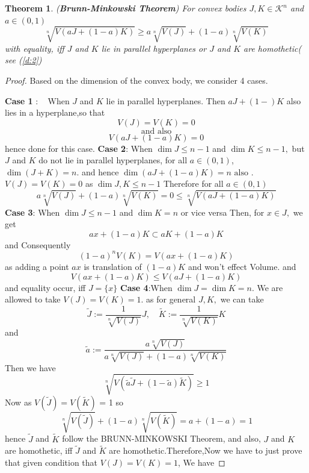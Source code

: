 \documentclass[oneside]{book}
\newtheorem{theorem}{Theorem}[section]
\begin{document}
	\begin{theorem}(\textbf{Brunn-Minkowski Theorem})
		\label{t:11}
		For convex bodies $J, K \in \mathcal{K}^{n}$ and $a \in(0,1)$
		\begin{equation}
			\label{eq54}
			\sqrt[n]{V(a J+(1-a) K)} \geq a \sqrt[n]{V(J)}+(1-a) \sqrt[n]{V(K)}
		\end{equation} \label{eq:4.19}
		with equality, iff $J$ and $K$ lie in parallel hyperplanes or $J$ and $K$ are homothetic( see (\ref{d:2})
	\end{theorem}
	\begin{proof}
		Based on the dimension of the convex body, we consider 4 cases.
		\hfill \break
		
		\textbf{Case 1} $: \quad \text{When } J$ and $K$ lie in parallel hyperplanes. Then  $a J+(1-) K$  also lies in a hyperplane,\quad so that $$V(J)=V(K)=0$$    $$\text{and also}$$ $$V(a J+(1-a) K)=0$$
		hence done for this case.
		\hfill \break
		\textbf{Case 2}: \quad  When $\operatorname{dim} J \leq n-1$ and $\operatorname{dim} K \leq n-1,$ but $J$ and $K$ do not lie in parallel hyperplanes, for all $a \in(0,1)$, $\operatorname{dim}(J+K)=n .$ and hence  $\operatorname{dim}(a J+(1-a) K)=n \text{ also }.$ 
		\hfill \break
		$V(J) = V(K)= 0$ as $\operatorname{dim} J,K \leq n-1 $ Therefore for all $a \in(0,1)$
		$$
		a \sqrt[n]{V(J)}+(1-a) \sqrt[n]{V(K)}=0 \leq \sqrt[n]{V(a J+(1-a) K)}
		$$
		\hfill \break
		\textbf{Case 3}: \quad  When $\operatorname{dim } J \leq n-1$ and $\operatorname{dim} K=n$ or vice versa
		\hfill \break 
		Then, for $x \in J,$ we get
		\[
		a x+(1-a) K \subset a K+(1-a) K
		\]
		and Consequently
		\[
		(1-a)^{n} V(K)=V(a x+(1-a) K) 
		\]
		as adding a point $a x $ is translation of $(1-a) K$ and won't effect Volume. 
		and
		$$ V(a x+(1-a) K) \leq V(a 
		J+(1-a) K)$$
		and equality occur, iff $J=\{x\}$ 
		\hfill \break
		\textbf{Case 4}:When $\operatorname{dim} J=\operatorname{dim} K=n .$  We are allowed to take $V(J)=V(K)=1 .$ as for general $J, K,$  we  can take
		\[
		\widetilde{J}:=\frac{1}{\sqrt[n]{V(J)}} J, \quad \widetilde{K}:=\frac{1}{\sqrt[n]{V(K)}} K
		\]
		and
		\[
		\widetilde{a}:=\frac{a \sqrt[n]{V(J)}}{a \sqrt[n]{V(J)}+(1-a) \sqrt[n]{V(K)}}
		\]
		Then we have
		\[
		\sqrt[n]{V({\widetilde{a} \widetilde{ J} }+(1-\widetilde{a}) \widetilde{K})} \geq 1
		\]
		Now  as $V(\widetilde{J}) = V(\widetilde{K})$ = 1 so $$\sqrt[n]{V(\widetilde{J})}+(1-a) \sqrt[n]{V(\widetilde {K})}=a+(1-a)=1$$
		hence $\widetilde{J}$ and $\widetilde{K}$
		follow the BRUNN-MINKOWSKI Theorem,  and also, $J$ and $K$ are homothetic, iff $\widetilde{J}$ and $\widetilde{K}$ are homothetic.Therefore,Now  we have to just prove that given condition that $V(J)=V(K)=1$, We have 

\end{proof}
\end{document}
